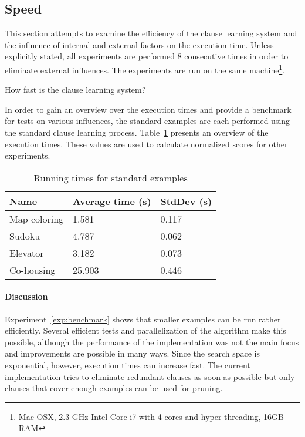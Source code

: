 \subsection{Speed}

This section attempts to examine the efficiency of the clause learning system and the influence of internal and external factors on the execution time.
Unless explicitly stated, all experiments are performed $8$ consecutive times in order to eliminate external influences.
The experiments are run on the same machine\footnote{Mac OSX, 2.3 GHz Intel Core i7 with 4 cores and hyper threading, 16GB RAM}.

\begin{question}
	How fast is the clause learning system?
\end{question}

\begin{experiment}
\label{exp:benchmark}
	In order to gain an overview over the execution times and provide a benchmark for tests on various influences, the standard examples are each performed using the standard clause learning process.
	Table~\ref{tbl:exp_speed_standard} presents an overview of the execution times.
	These values are used to calculate normalized scores for other experiments.
	
	\begin{table}[!htp]
		\begin{tabularx}{\textwidth}{XXX}
			\textbf{Name}	& \textbf{Average time (s)}	& \textbf{StdDev (s)} \\
			\toprule
			Map coloring 	& 1.581				& 0.117 \\
			Sudoku 			& 4.787				& 0.062 \\
			Elevator 		& 3.182 			& 0.073 \\
			Co-housing 		& 25.903			& 0.446
		\end{tabularx}
		\caption{Running times for standard examples}
		\label{tbl:exp_speed_standard}
	\end{table}

\end{experiment}

\paragraph{Discussion}
Experiment~\ref{exp:benchmark} shows that smaller examples can be run rather efficiently.
Several efficient tests and parallelization of the algorithm make this possible, although the performance of the implementation was not the main focus and improvements are possible in many ways.
Since the search space is exponential, however, execution times can increase fast.
The current implementation tries to eliminate redundant clauses as soon as possible but only clauses that cover enough examples can be used for pruning.

